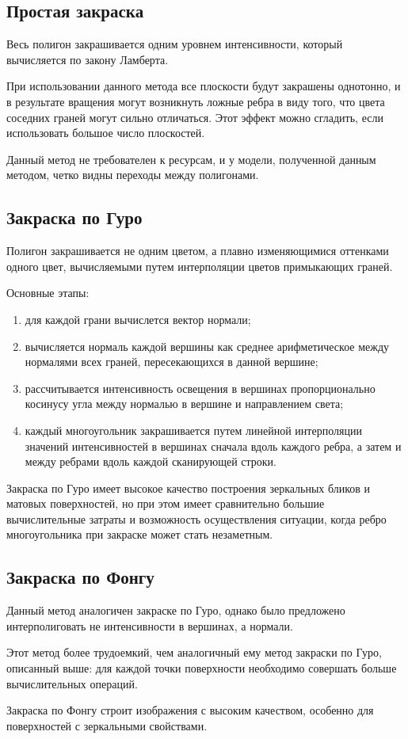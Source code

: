 	\subsection*{Простая закраска}
	\par Весь полигон закрашивается одним уровнем интенсивности, который вычисляется по закону Ламберта.
	\par При использовании данного метода все плоскости будут закрашены однотонно, и в результате вращения могут возникнуть ложные ребра в виду того, что цвета соседних граней могут сильно отличаться. Этот эффект можно сгладить, если использовать большое число плоскостей.
	\par Данный метод не требователен к ресурсам, и у модели, полученной данным методом, четко видны переходы между полигонами.

	\subsection*{Закраска по Гуро}
	\par Полигон закрашивается не одним цветом, а плавно изменяющимися оттенками одного цвет, вычисляемыми путем интерполяции цветов примыкающих граней.
	\par Основные этапы:
	\begin{enumerate}
		\item для каждой грани вычислется вектор нормали;
		\item вычисляется нормаль каждой вершины как среднее арифметическое между нормалями всех граней, пересекающихся в данной вершине;
		\item рассчитывается интенсивность освещения в вершинах пропорционально косинусу угла между нормалью в вершине и направлением света;
		\item каждый многоугольник закрашивается путем линейной интерполяции значений интенсивностей в вершинах сначала вдоль каждого ребра, а затем и между ребрами вдоль каждой сканирующей строки.
	\end{enumerate}
	\par Закраска по Гуро имеет высокое качество построения зеркальных бликов и матовых поверхностей, но при этом имеет сравнительно большие вычислительные затраты и возможность осуществления ситуации, когда ребро многоугольника при закраске может стать незаметным.

	\subsection*{Закраска по Фонгу}
	\par Данный метод аналогичен закраске по Гуро, однако было предложено интерполиговать не интенсивности в вершинах, а нормали.
	\par Этот метод более трудоемкий, чем аналогичный ему метод закраски по Гуро, описанный выше: для каждой точки поверхности необходимо совершать больше вычислительных операций.
	\par Закраска по Фонгу строит изображения с высоким качеством, особенно для поверхностей с зеркальными свойствами.

